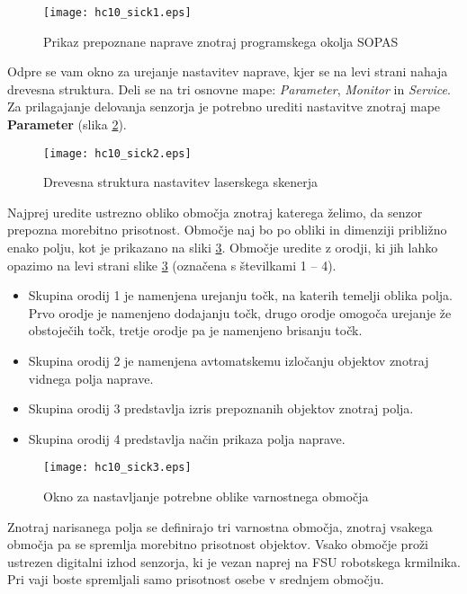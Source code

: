 \begin{figure}[!hbt]
	\centering
	\texttt{[image: hc10\_sick1.eps]}
	\caption{Prikaz prepoznane naprave znotraj programskega okolja SOPAS}
	\label{fig:hc10_sick1}
\end{figure}

Odpre se vam okno za urejanje nastavitev naprave, kjer se na levi strani nahaja drevesna struktura. Deli se na tri osnovne mape: \emph{Parameter}, \emph{Monitor} in \emph{Service}. Za prilagajanje delovanja senzorja je potrebno urediti nastavitve znotraj mape \textbf{Parameter} (slika \ref{fig:hc10_sick2}).

\begin{figure}[!hbt]
	\centering
	\texttt{[image: hc10\_sick2.eps]}
	\caption{Drevesna struktura nastavitev laserskega skenerja}
	\label{fig:hc10_sick2}
\end{figure}

Najprej uredite ustrezno obliko območja znotraj katerega želimo, da senzor prepozna morebitno prisotnost. Območje naj bo po obliki in dimenziji približno enako polju, kot je prikazano na sliki \ref{fig:hc10_sick3}. Območje uredite z orodji, ki jih lahko opazimo na levi strani slike \ref{fig:hc10_sick3} (označena s številkami 1 -- 4).
\begin{itemize}
	\item Skupina orodij 1 je namenjena urejanju točk, na katerih temelji oblika polja. Prvo orodje je namenjeno dodajanju točk, drugo orodje omogoča urejanje že obstoječih točk, tretje orodje pa je namenjeno brisanju točk.
	\item Skupina orodij 2 je namenjena avtomatskemu izločanju objektov znotraj vidnega polja naprave.
	\item Skupina orodij 3 predstavlja izris prepoznanih objektov znotraj polja.
	\item Skupina orodij 4 predstavlja način prikaza polja naprave.
\end{itemize}

\begin{figure}[!hbt]
	\centering
	\texttt{[image: hc10\_sick3.eps]}
	\caption{Okno za nastavljanje potrebne oblike varnostnega območja}
	\label{fig:hc10_sick3}
\end{figure}

Znotraj narisanega polja se definirajo tri varnostna območja, znotraj vsakega območja pa se spremlja morebitno prisotnost objektov. Vsako območje pro\v zi ustrezen digitalni izhod senzorja, ki je vezan naprej na FSU robotskega krmilnika. Pri vaji boste spremljali samo prisotnost osebe v srednjem območju.

